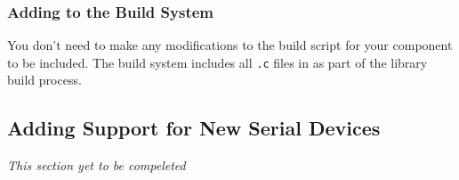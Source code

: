 \subsubsection{Adding to the Build System}
You don't need to make any modifications to the build script for your component
to be included. The build system includes all \texttt{.c} files in
 as part of the library build process.

\subsection{Adding Support for New Serial Devices}
\textit{This section yet to be compeleted}
